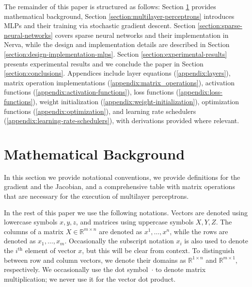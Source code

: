 \documentclass[twoside,11pt]{article}
\newcommand{\Reals}{\mathbb{R}}
\begin{document}
The remainder of this paper is structured as follows: Section \ref{section:mathematical-background} provides mathematical background, Section \ref{section:multilayer-perceptrons} introduces MLPs and their training via stochastic gradient descent. Section \ref{section:sparse-neural-networks} covers sparse neural networks and their implementation in Nerva, while the design and implementation details are described in Section \ref{section:design-implementation-mlps}. Section \ref{section:experimental-results} presents experimental results and we conclude the paper in Section \ref{section:conclusions}. Appendices include layer equations (\ref{appendix:layers}), matrix operation implementations (\ref{appendix:matrix_operations}), activation functions (\ref{appendix:activation-functions}), loss functions (\ref{appendix:loss-functions}), weight initialization (\ref{appendix:weight-initialization}), optimization functions (\ref{appendix:optimization}), and learning rate schedulers (\ref{appendix:learning-rate-schedulers}), with derivations provided where relevant.


\section{Mathematical Background} \label{section:mathematical-background}
In this section we provide notational conventions, we provide definitions for the gradient and the Jacobian, and a comprehensive table with matrix operations that are necessary for the execution of multilayer perceptrons.

In the rest of this paper we use the following notations. Vectors are denoted using lowercase symbols $x, y, z$, and matrices using uppercase symbols $X, Y, Z$. The columns of a matrix $X \in \Reals^{m \times n}$ are denoted as $x^1, \ldots, x^n$, while the rows are denoted as $x_1, \ldots, x_m$. Occasionally the subscript notation $x_i$ is also used to denote the $i^\text{th}$ element of vector $x$, but this will be clear from context.
To distinguish between row and column vectors, we denote their domains as $\Reals^{1 \times n}$ and $\Reals^{m \times 1}$, respectively. We occasionally use the dot symbol~$\cdot$ to denote matrix multiplication; we never use it for the vector dot product.
\end{document}

